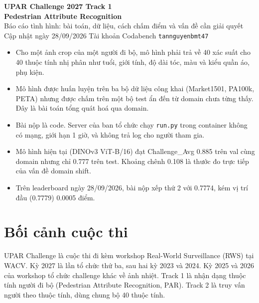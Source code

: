 \documentclass[11pt,a4paper]{article}
\begin{document}
\begin{center}
{\sffamily\bfseries\LARGE UPAR Challenge 2027 \textendash{} Track 1\\[3pt]
\Large Pedestrian Attribute Recognition}\\[8pt]
{\large Báo cáo tình hình: bài toán, dữ liệu, cách chấm điểm và vấn đề cần giải quyết}\\[6pt]
{\small Cập nhật ngày 28/09/2026 \quad Tài khoản Codabench \texttt{tannguyenbmt47}}
\end{center}

\begin{ghichu}
\begin{itemize}[leftmargin=1.2em]
\item Cho một ảnh crop của một người đi bộ, mô hình phải trả về 40 xác suất cho 40 thuộc tính nhị phân như tuổi, giới tính, độ dài tóc, màu và kiểu quần áo, phụ kiện.
\item Mô hình được huấn luyện trên ba bộ dữ liệu công khai (Market1501, PA100k, PETA) nhưng được chấm trên một bộ test ẩn đến từ domain chưa từng thấy. Đây là bài toán tổng quát hoá qua domain.
\item Bài nộp là code. Server của ban tổ chức chạy \texttt{run.py} trong container không có mạng, giới hạn 1 giờ, và không trả log cho người tham gia.
\item Mô hình hiện tại (DINOv3 ViT-B/16) đạt Challenge\_Avg 0.885 trên val cùng domain nhưng chỉ 0.777 trên test. Khoảng chênh 0.108 là thước đo trực tiếp của vấn đề domain shift.
\item Trên leaderboard ngày 28/09/2026, bài nộp xếp thứ 2 với 0.7774, kém vị trí đầu (0.7779) 0.0005 điểm.
\end{itemize}
\end{ghichu}

\section{Bối cảnh cuộc thi}

UPAR Challenge là cuộc thi đi kèm workshop Real-World Surveillance (RWS) tại WACV. Kỳ 2027 là lần tổ chức thứ ba, sau hai kỳ 2023 và 2024. Kỳ 2025 và 2026 của workshop tổ chức challenge khác về ảnh nhiệt. Track 1 là nhận dạng thuộc tính người đi bộ (Pedestrian Attribute Recognition, PAR). Track 2 là truy vấn người theo thuộc tính, dùng chung bộ 40 thuộc tính.
\end{document}
